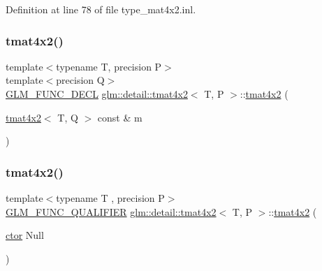 Definition at line 78 of file type\+\_\+mat4x2.\+inl.

\mbox{\label{structglm_1_1detail_1_1tmat4x2_ac81c7bdc54e869320b7fe713ef361f4c}} 
\subsubsection{\texorpdfstring{tmat4x2()}{tmat4x2()}\hspace{0.1cm}{\footnotesize\ttfamily [3/22]}}
{\footnotesize\ttfamily template$<$typename T, precision P$>$ \\
template$<$precision Q$>$ \\
\hyperlink{setup_8hpp_ab2d052de21a70539923e9bcbf6e83a51}{G\+L\+M\+\_\+\+F\+U\+N\+C\+\_\+\+D\+E\+CL} \hyperlink{structglm_1_1detail_1_1tmat4x2}{glm\+::detail\+::tmat4x2}$<$ T, P $>$\+::\hyperlink{structglm_1_1detail_1_1tmat4x2}{tmat4x2} (\begin{DoxyParamCaption}\item[{\hyperlink{structglm_1_1detail_1_1tmat4x2}{tmat4x2}$<$ T, Q $>$ const \&}]{m }\end{DoxyParamCaption})}

\mbox{\label{structglm_1_1detail_1_1tmat4x2_a2abefa2846a92e5b1f5efc365a784791}} 
\subsubsection{\texorpdfstring{tmat4x2()}{tmat4x2()}\hspace{0.1cm}{\footnotesize\ttfamily [4/22]}}
{\footnotesize\ttfamily template$<$typename T , precision P$>$ \\
\hyperlink{setup_8hpp_a33fdea6f91c5f834105f7415e2a64407}{G\+L\+M\+\_\+\+F\+U\+N\+C\+\_\+\+Q\+U\+A\+L\+I\+F\+I\+ER} \hyperlink{structglm_1_1detail_1_1tmat4x2}{glm\+::detail\+::tmat4x2}$<$ T, P $>$\+::\hyperlink{structglm_1_1detail_1_1tmat4x2}{tmat4x2} (\begin{DoxyParamCaption}\item[{\hyperlink{structglm_1_1detail_1_1tmat4x2_a4266befa296229458f2652dcc4ba4a72}{ctor}}]{Null }\end{DoxyParamCaption})\hspace{0.3cm}{\ttfamily [explicit]}}



